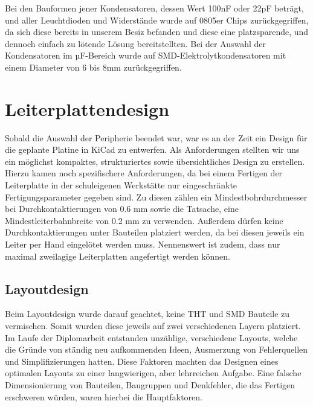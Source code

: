 Bei den Bauformen jener Kondensatoren, dessen Wert 100nF oder 22pF beträgt, und aller Leuchtdioden und Widerstände wurde auf 0805er Chips zurückgegriffen,
da sich diese bereits in unserem Besiz befanden und diese eine platzsparende, und dennoch einfach zu lötende Lösung bereitstellten.
Bei der Auswahl der Kondensatoren im µF-Bereich wurde auf SMD-Elektrolytkondensatoren mit einem Diameter von 6 bis 8mm zurückgegriffen.


\newpage
\section{Leiterplattendesign}

Sobald die Auswahl der Peripherie beendet war, war es an der Zeit ein Design für die geplante Platine in KiCad zu entwerfen.
Als Anforderungen stellten wir uns ein möglichst kompaktes, strukturiertes sowie übersichtliches Design zu erstellen.
Hierzu kamen noch spezifischere Anforderungen, da bei einem Fertigen der Leiterplatte in der schuleigenen Werkstätte nur eingeschränkte Fertigungsparameter gegeben sind.
Zu diesen zählen ein Mindestbohrdurchmesser bei Durchkontaktierungen von 0.6 mm sowie die Tatsache, eine Mindestleiterbahnbreite von 0.2 mm zu verwenden.
Außerdem dürfen keine Durchkontaktierungen unter Bauteilen platziert werden, da bei diesen jeweils ein Leiter per Hand eingelötet werden muss.
Nennenswert ist zudem, dass nur maximal zweilagige Leiterplatten angefertigt werden können.

\subsection{Layoutdesign}

Beim Layoutdesign wurde darauf geachtet, keine \acs{THT} und SMD Bauteile zu vermischen.
Somit wurden diese jeweils auf zwei verschiedenen Layern platziert. \\
Im Laufe der Diplomarbeit entstanden unzählige, verschiedene Layouts, welche die Gründe von ständig neu aufkommenden Ideen, Ausmerzung von Fehlerquellen und Simplifizierungen hatten.
Diese Faktoren machten das Designen eines optimalen Layouts zu einer langwierigen, aber lehrreichen Aufgabe.
Eine falsche Dimensionierung von Bauteilen, Baugruppen und Denkfehler, die das Fertigen erschweren würden, waren hierbei die Hauptfaktoren. \\

